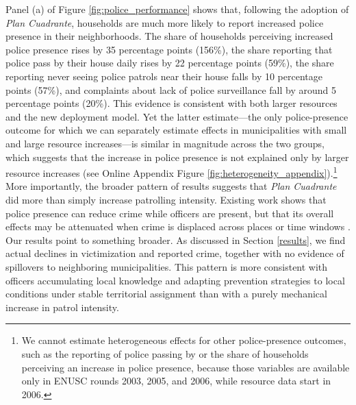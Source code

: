 Panel (a) of Figure \ref{fig:police_performance} shows that, following the adoption of \emph{Plan Cuadrante}, households are much more likely to report increased police presence in their neighborhoods. The share of households perceiving increased police presence rises by 35 percentage points (156\%), the share reporting that police pass by their house daily rises by 22 percentage points (59\%), the share reporting never seeing police patrols near their house falls by 10 percentage points (57\%), and complaints about lack of police surveillance fall by around 5 percentage points (20\%). This evidence is consistent with both larger resources and the new deployment model. Yet the latter estimate---the only police-presence outcome for which we can separately estimate effects in municipalities with small and large resource increases---is similar in magnitude across the two groups, which suggests that the increase in police presence is not explained only by larger resource increases (see Online Appendix Figure \ref{fig:heterogeneity_appendix}).\footnote{We cannot estimate heterogeneous effects for other police-presence outcomes, such as the reporting of police passing by or the share of households perceiving an increase in police presence, because those variables are available only in ENUSC rounds 2003, 2005, and 2006, while resource data start in 2006.} More importantly, the broader pattern of results suggests that \emph{Plan Cuadrante} did more than simply increase patrolling intensity. Existing work shows that police presence can reduce crime while officers are present, but that its overall effects may be attenuated when crime is displaced across places or time windows \citep{MASTROBUONI2019, Blanes_Mastrobuoni_2018}. Our results point to something broader. As discussed in Section \ref{results}, we find actual declines in victimization and reported crime, together with no evidence of spillovers to neighboring municipalities. This pattern is more consistent with officers accumulating local knowledge and adapting prevention strategies to local conditions under stable territorial assignment than with a purely mechanical increase in patrol intensity.

